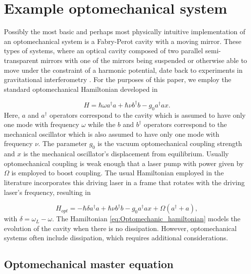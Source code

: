 \documentclass[12pt]{article}
\begin{document}
\section{Example optomechanical system}\label{sec:ExampleSystem}

Possibly the most basic and perhaps most physically intuitive implementation of an optomechanical system is a Fabry-Perot cavity with a moving mirror. These types of systems, where an optical cavity composed of two parallel semi-transparent mirrors with one of the mirrors being suspended or otherwise able to move under the constraint of a harmonic potential, date back to experiments in gravitational interferometry \cite{AbramoviciLIGO1992}. For the purposes of this paper, we employ the standard optomechanical Hamiltonian developed in \cite{LawMovingMirror1995}

\begin{equation}\label{eq:basic_hamiltonian}
    H=\hbar \omega a^\dagger a + \hbar\nu b^\dagger b - g_0 a^\dagger a x.
\end{equation} Here, $a$ and $a^\dagger$ operators correspond to the cavity which is assumed to have only one mode with frequency $\omega$ while the $b$ and $b^\dagger$ operators correspond to the mechanical oscillator which is also assumed to have only one mode with frequency $\nu$. The parameter $g_0$ is the vacuum optomechanical coupling strength and $x$ is the mechanical oscillator's displacement from equilibrium.  Usually optomechanical coupling is weak enough that a laser pump with power given by $\Omega$ is employed to boost coupling. The usual Hamiltonian employed in the literature incorporates this driving laser in a frame that rotates with the driving laser's frequency, resulting in

\begin{equation}\label{eq:Optomechanic_hamiltonian}
    H_{opt}=-\hbar \delta a^\dagger a + \hbar\nu b^\dagger b - g_0 a^\dagger a x + \Omega(a^\dagger+a),
\end{equation} with $\delta = \omega_L-\omega$. The Hamiltonian \eqref{eq:Optomechanic_hamiltonian} models the evolution of the cavity when there is no dissipation. However, optomechanical systems often include dissipation, which requires additional considerations.

\subsection{Optomechanical master equation}
\end{document}
